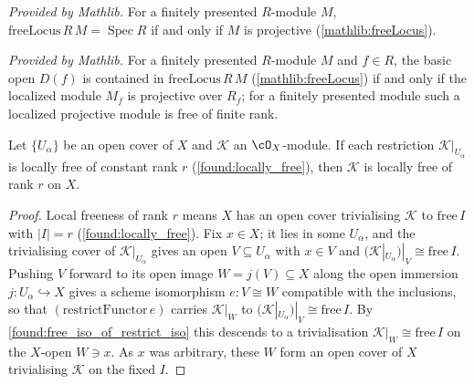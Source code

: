 \begin{lemma}
  \label{mathlib:freeLocus_eq_univ_iff}
  \mathlibok
  \textit{Provided by Mathlib.}
  For a finitely presented \(R\)-module \(M\),
  \(\mathrm{freeLocus}\,R\,M=\operatorname{Spec}R\) if and only if \(M\) is
  projective (\cref{mathlib:freeLocus}).
\end{lemma}

\begin{lemma}
  \label{mathlib:basicOpen_subset_freeLocus_iff}
  \mathlibok
  \textit{Provided by Mathlib.}
  For a finitely presented \(R\)-module \(M\) and \(f\in R\), the basic open
  \(D(f)\) is contained in \(\mathrm{freeLocus}\,R\,M\) (\cref{mathlib:freeLocus})
  if and only if the localized module \(M_f\) is projective over \(R_f\); for a
  finitely presented module such a localized projective module is free of finite
  rank.
\end{lemma}


\begin{lemma}
  \label{lem:isLocallyFree_local}
  Let \(\{U_\alpha\}\) be an open cover of \(X\) and \(\mathcal K\) an
  \(\cO_X\)-module.  If each restriction \(\mathcal K|_{U_\alpha}\) is locally free
  of constant rank \(r\) (\cref{found:locally_free}), then \(\mathcal K\) is locally
  free of rank \(r\) on \(X\).
\end{lemma}

\begin{proof}
  \leanok
  Local freeness of rank \(r\) means \(X\) has an open cover trivialising
  \(\mathcal K\) to \(\mathrm{free}\,I\) with \(|I|=r\) (\cref{found:locally_free}).
  Fix \(x\in X\); it lies in some \(U_\alpha\), and the trivialising cover of
  \(\mathcal K|_{U_\alpha}\) gives an open \(V\subseteq U_\alpha\) with
  \(x\in V\) and \((\mathcal K|_{U_\alpha})|_V\cong\mathrm{free}\,I\).  Pushing \(V\)
  forward to its open image \(W=j(V)\subseteq X\) along the open immersion
  \(j:U_\alpha\hookrightarrow X\) gives a scheme isomorphism \(e:V\cong W\) compatible
  with the inclusions, so that \((\mathrm{restrictFunctor}\,e)\) carries
  \(\mathcal K|_W\) to \((\mathcal K|_{U_\alpha})|_V\cong\mathrm{free}\,I\).  By
  \cref{found:free_iso_of_restrict_iso} this descends to a trivialisation
  \(\mathcal K|_W\cong\mathrm{free}\,I\) on the \(X\)-open \(W\ni x\).  As \(x\) was
  arbitrary, these \(W\) form an open cover of \(X\) trivialising \(\mathcal K\) on
  the fixed \(I\).
\end{proof}

